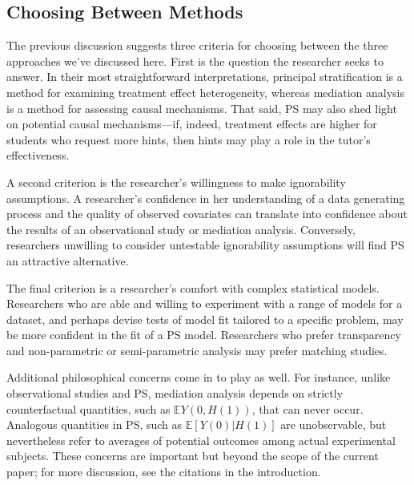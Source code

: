 \documentclass{article}\usepackage[]{graphicx}\usepackage[]{color}
\newcommand{\EE}{\mathbb{E}}
\begin{document}
\subsection{Choosing Between Methods}

The previous discussion suggests three criteria for choosing between
the three approaches we've discussed here.
First is the question the researcher seeks to answer.
In their most straightforward interpretations, principal stratification
is a method for examining treatment effect heterogeneity, whereas
mediation analysis is a method for assessing causal mechanisms.
That said, PS may also shed light on potential causal mechanisms---if,
indeed, treatment effects are higher for students who request more
hints, then hints may play a role in the tutor's effectiveness.

A second criterion is the researcher's willingness to make
ignorability assumptions.
A researcher's confidence in her understanding of a data generating
process and the quality of observed covariates can translate into
confidence about the results of an observational study or mediation
analysis.
Conversely, researchers unwilling to consider untestable ignorability
assumptions will find PS an attractive alternative.

The final criterion is a researcher's comfort with complex statistical
models.
Researchers who are able and willing to experiment with a range of
models for a dataset, and perhaps devise tests of model fit tailored
to a specific problem, may be more confident in the fit of a PS model.
Researchers who prefer transparency and non-parametric or
semi-parametric analysis may prefer matching studies.

Additional philosophical concerns come in to play as well.
For instance, unlike observational studies and PS, mediation analysis
depends on strictly counterfactual quantities, such as $\EE Y(0,H(1))$,
that can never occur.
Analogous quantities in PS, such as $\EE [Y(0)|H(1)]$ are
unobservable, but nevertheless refer to averages of potential outcomes
among actual experimental subjects.
These concerns are important but beyond the scope of the current
paper; for more discussion, see the citations in the introduction.

\end{document}
